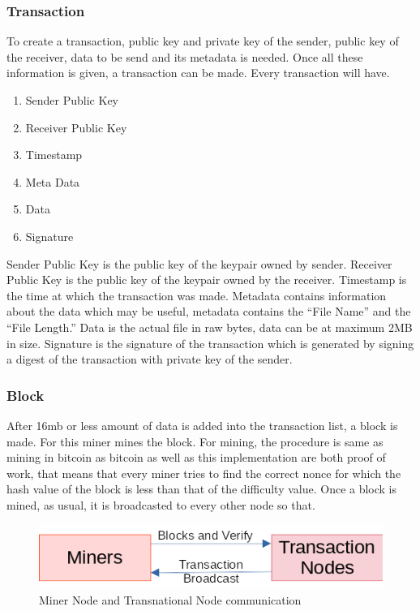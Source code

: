 \documentclass[conference]{IEEEtran}
\begin{document}
\subsubsection{Transaction}
To create a transaction, public key and private key of the sender, public key of the receiver, data to be send and its metadata is needed. Once all these information is given, a transaction can be made. Every transaction will have. 
\begin{enumerate}[(1)]
	\item Sender Public Key 
	
	\item Receiver Public Key 
	
	\item Timestamp 
	
	\item Meta Data 
	
	\item Data 
	
	\item Signature 
\end{enumerate}
Sender Public Key is the public key of the keypair owned by sender. Receiver Public Key is the public key of the keypair owned by the receiver\cite{b5}. Timestamp is the time at which the transaction was made. Metadata contains information about the data which may be useful, metadata contains the “File Name” and the “File Length.” Data is the actual file in raw bytes, data can be at maximum 2MB in size. Signature is the signature of the transaction which is generated by signing a digest of the transaction with private key of the sender.
\subsubsection{Block}
After 16mb or less amount of data is added into the transaction list, a block is made. For this miner mines the block. For mining, the procedure is same as mining in bitcoin as bitcoin as well as this implementation are both proof of work, that means that every miner tries to find the correct nonce for which the hash value of the block is less than that of the difficulty value. Once a block is mined, as usual, it is broadcasted to every other node so that.  

\begin{figure}[h!]
	\centering
	\includegraphics[width=0.7\linewidth]{BlockBroadCast}
	\caption{Miner Node and Transnational Node communication}
	\label{fig:blockbroadcast}
\end{figure}
\end{document}
